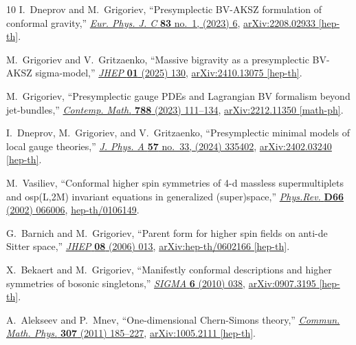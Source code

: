 \documentclass[a4paper,12pt]{article}
\numberwithin{equation}{section} %
\numberwithin{equation}{section}
\begin{document}
\begin{thebibliography}{10}
I.~Dneprov and M.~Grigoriev, ``{Presymplectic BV-AKSZ formulation of conformal gravity},'' \href{http://dx.doi.org/10.1140/epjc/s10052-022-11082-6}{{\em Eur. Phys. J. C} {\bfseries 83} no.~1, (2023) 6}, \href{http://arxiv.org/abs/2208.02933}{{\ttfamily arXiv:2208.02933 [hep-th]}}.

M.~Grigoriev and V.~Gritzaenko, ``{Massive bigravity as a presymplectic BV-AKSZ sigma-model},'' \href{http://dx.doi.org/10.1007/JHEP01(2025)130}{{\em JHEP} {\bfseries 01} (2025) 130}, \href{http://arxiv.org/abs/2410.13075}{{\ttfamily arXiv:2410.13075 [hep-th]}}.

M.~Grigoriev, ``{Presymplectic gauge PDEs and Lagrangian BV formalism beyond jet-bundles},'' \href{http://dx.doi.org/10.1090/conm/788/15822}{{\em Contemp. Math.} {\bfseries 788} (2023) 111--134}, \href{http://arxiv.org/abs/2212.11350}{{\ttfamily arXiv:2212.11350 [math-ph]}}.

I.~Dneprov, M.~Grigoriev, and V.~Gritzaenko, ``{Presymplectic minimal models of local gauge theories},'' \href{http://dx.doi.org/10.1088/1751-8121/ad65a3}{{\em J. Phys. A} {\bfseries 57} no.~33, (2024) 335402}, \href{http://arxiv.org/abs/2402.03240}{{\ttfamily arXiv:2402.03240 [hep-th]}}.

M.~Vasiliev, ``{C}onformal higher spin symmetries of 4-d massless supermultiplets and osp({L},2{M}) invariant equations in generalized (super)space,'' \href{http://dx.doi.org/10.1103/PhysRevD.66.066006}{{\em Phys.Rev.} {\bfseries D66} (2002) 066006},
\href{http://arxiv.org/abs/hep-th/0106149}{{\ttfamily hep-th/0106149}}.

G.~Barnich and M.~Grigoriev, ``{P}arent form for higher spin fields on anti-de {S}itter space,'' \href{http://dx.doi.org/10.1088/1126-6708/2006/08/013}{{\em JHEP} {\bfseries 08} (2006) 013},
\href{http://arxiv.org/abs/hep-th/0602166}{{\ttfamily arXiv:hep-th/0602166 [hep-th]}}.

X.~Bekaert and M.~Grigoriev, ``{M}anifestly conformal descriptions and higher symmetries of bosonic singletons,'' \href{http://dx.doi.org/10.3842/SIGMA.2010.038}{{\em SIGMA} {\bfseries 6} (2010) 038},
\href{http://arxiv.org/abs/0907.3195}{{\ttfamily arXiv:0907.3195 [hep-th]}}.

A.~Alekseev and P.~Mnev, ``{One-dimensional Chern-Simons theory},'' \href{http://dx.doi.org/10.1007/s00220-011-1290-1}{{\em Commun. Math. Phys.} {\bfseries 307} (2011) 185--227}, \href{http://arxiv.org/abs/1005.2111}{{\ttfamily arXiv:1005.2111 [hep-th]}}.


\end{thebibliography}
\end{document}

